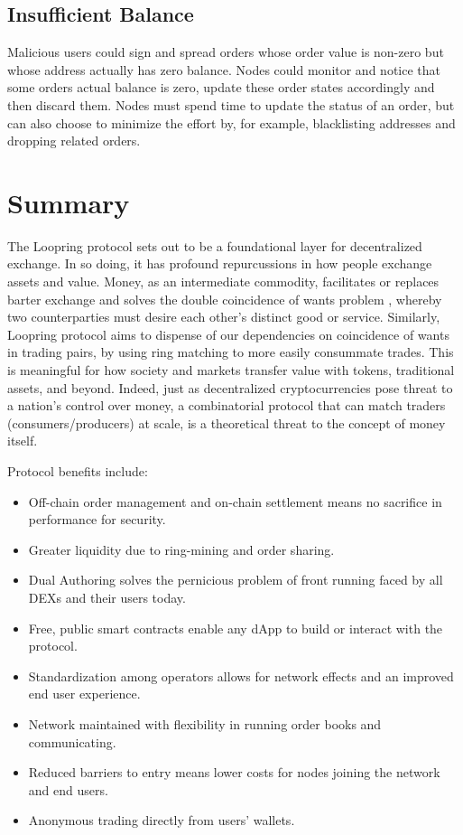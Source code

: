 \documentclass[UTF8,nofonts]{article}
\begin{document}
\begin{multicols}{2}
\subsection{Insufficient Balance}
Malicious users could sign and spread orders whose order value is non-zero but whose address actually has zero balance. Nodes could monitor and notice that some orders actual balance is zero, update these order states accordingly and then discard them.
Nodes must spend time to update the status of an order, but can also choose to minimize the effort by, for example, blacklisting addresses and dropping related orders.

\section{Summary}

The Loopring protocol sets out to be a foundational layer for decentralized exchange. In so doing, it has profound repurcussions in how people exchange assets and value. Money, as an intermediate commodity, facilitates or replaces barter exchange and solves the double coincidence of wants problem \cite{unenumerated2006}, whereby two counterparties must desire each other's distinct good or service. Similarly, Loopring protocol aims to dispense of our dependencies on coincidence of wants in trading pairs, by using ring matching to more easily consummate trades. This is meaningful for how society and markets transfer value with tokens, traditional assets, and beyond. Indeed, just as decentralized cryptocurrencies pose threat to a nation's control over money, a combinatorial protocol that can match traders (consumers/producers) at scale, is a theoretical threat to the concept of money itself.

Protocol benefits include:

\begin{itemize}
	\item Off-chain order management and on-chain settlement means no sacrifice in performance for security.
	\item Greater liquidity due to ring-mining and order sharing.
	\item Dual Authoring solves the pernicious problem of front running faced by all DEXs and their users today.
	\item Free, public smart contracts enable any dApp to build or interact with the protocol.
	\item Standardization among operators allows for network effects and an improved end user experience.
	\item Network maintained with flexibility in running order books and communicating.
	\item Reduced barriers to entry means lower costs for nodes joining the network and end users.
	\item Anonymous trading directly from users’ wallets.
\end{itemize}


\end{multicols}
\end{document}
